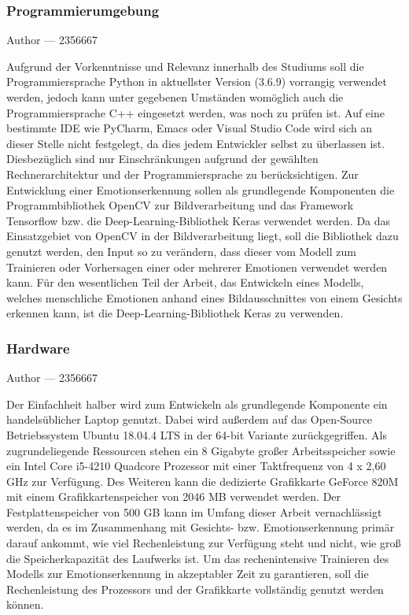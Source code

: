 \documentclass[12pt, a4paper]{report}
\makeatletter
\newcommand{\sectionauthor}[1]{%
  {\parindent0pt\vspace*{-5pt}%
  \large{Author --- }
  \linespread{1.1}\large\scshape#1%
  \par\nobreak\vspace*{35pt} }
  \@afterheading%
}
\makeatother
\begin{document}
\subsubsection{Programmierumgebung}
\sectionauthor{2356667}
Aufgrund der Vorkenntnisse und Relevanz innerhalb des Studiums soll die Programmiersprache Python in aktuellster Version (3.6.9) vorrangig verwendet werden, jedoch kann unter gegebenen Umständen womöglich auch die Programmiersprache C++ eingesetzt werden, was noch zu prüfen ist. Auf eine bestimmte IDE wie PyCharm, Emacs oder Visual Studio Code wird sich an dieser Stelle nicht festgelegt, da dies jedem Entwickler selbst zu überlassen ist. Diesbezüglich sind nur Einschränkungen aufgrund der gewählten Rechnerarchitektur und der Programmiersprache zu berücksichtigen.\newline
Zur Entwicklung einer Emotionserkennung sollen als grundlegende Komponenten die Programmbibliothek OpenCV zur Bildverarbeitung und das Framework Tensorflow bzw. die Deep-Learning-Bibliothek Keras verwendet werden. Da das Einsatzgebiet von OpenCV in der Bildverarbeitung liegt, soll die Bibliothek dazu genutzt werden, den Input so zu verändern, dass dieser vom Modell zum Trainieren oder Vorhersagen einer oder mehrerer Emotionen verwendet werden kann. Für den wesentlichen Teil der Arbeit, das Entwickeln eines Modells, welches menschliche Emotionen anhand eines Bildausschnittes von einem Gesichts erkennen kann, ist die Deep-Learning-Bibliothek Keras zu verwenden.
\subsubsection{Hardware}
\sectionauthor{2356667}
Der Einfachheit halber wird zum Entwickeln als grundlegende Komponente ein handelsüblicher Laptop genutzt. Dabei wird außerdem auf das Open-Source Betriebssystem Ubuntu 18.04.4 LTS in der 64-bit Variante zurückgegriffen. Als zugrundeliegende Ressourcen stehen ein 8 Gigabyte großer Arbeitsspeicher sowie ein Intel Core i5-4210 Quadcore Prozessor mit einer Taktfrequenz von 4 x 2,60 GHz zur Verfügung. Des Weiteren kann die dedizierte Grafikkarte GeForce 820M mit einem Grafikkartenspeicher von 2046 MB verwendet werden. Der Festplattenspeicher von 500 GB kann im Umfang dieser Arbeit vernachlässigt werden, da es im Zusammenhang mit Gesichts- bzw. Emotionserkennung primär darauf ankommt, wie viel Rechenleistung zur Verfügung steht und nicht, wie groß die Speicherkapazität des Laufwerks ist. Um das rechenintensive Trainieren des Modells zur Emotionserkennung in akzeptabler Zeit zu garantieren, soll die Rechenleistung des Prozessors und der Grafikkarte vollständig genutzt werden können.
\end{document}
